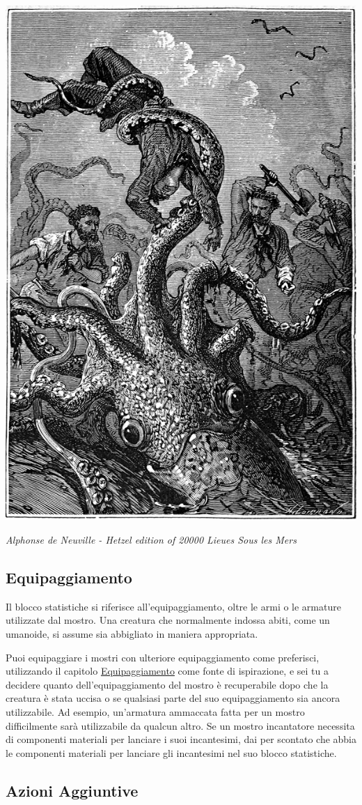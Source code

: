 \begin{multicols}{2}
	\begin{center}
		\includegraphics[width=0.55\linewidth]{immagini/polpo.png}

		\textit{Alphonse de Neuville - Hetzel edition of 20000 Lieues Sous les Mers}
	\end{center}


	\subsection{Equipaggiamento}

	Il blocco statistiche si riferisce all'equipaggiamento, oltre le armi o le armature utilizzate dal mostro. Una creatura che normalmente indossa abiti, come un umanoide, si assume sia abbigliato in maniera appropriata.

	Puoi equipaggiare i mostri con ulteriore equipaggiamento come preferisci, utilizzando il capitolo \hyperlink{equipaggiamento}{Equipaggiamento} come fonte di ispirazione, e sei tu a decidere quanto dell'equipaggiamento del mostro è recuperabile dopo che la creatura è stata uccisa o se qualsiasi parte del suo equipaggiamento sia ancora utilizzabile. Ad esempio, un'armatura ammaccata fatta per un mostro difficilmente sarà utilizzabile da qualcun altro. Se un mostro incantatore necessita di componenti materiali per lanciare i suoi incantesimi, dai per scontato che abbia le componenti materiali per lanciare gli incantesimi nel suo blocco statistiche.

	\subsection{Azioni Aggiuntive}


\end{multicols}
